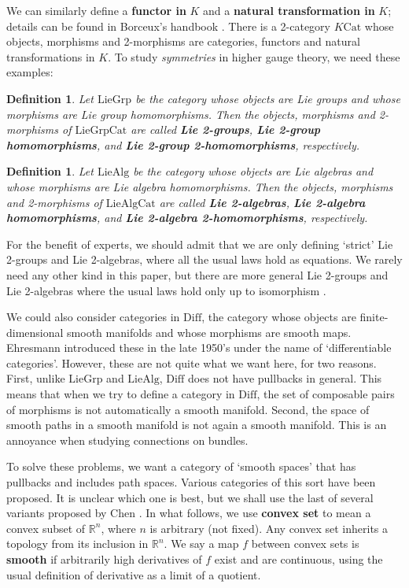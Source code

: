 \documentclass{article}
\newcommand{\R}{{\mathbb R}}
\newcommand{\Cat}{\mathrm{Cat}}
\newcommand{\Grp}{\mathrm{Grp}}
\newcommand{\Lie}{\mathrm{Lie}}
\newcommand{\Alg}{\mathrm{Alg}}
\newcommand{\Diff}{\mathrm{Diff}}
\newtheorem{definition}[theorem]{Definition}
\newcommand{\et}{\hspace{-0.08in}{\bf .}\hspace{0.1in}}
\begin{document}
We can similarly define a {\bf functor in} $K$ and a {\bf natural
transformation in} $K$; details can be found in Borceux's handbook
\cite{Borceux}.  There is a 2-category $K\Cat$ whose objects,
morphisms and 2-morphisms are categories, functors and natural
transformations in $K$.  To study \emph{symmetries} in higher
gauge theory, we need these examples:

\begin{definition} \et
\label{Lie 2-group}
Let $\Lie\Grp$ be the category whose objects are Lie groups and whose 
morphisms are Lie group homomorphisms.   Then the objects, morphisms
and 2-morphisms of $\Lie\Grp\Cat$ are called {\bf Lie 2-groups}, 
{\bf Lie 2-group homomorphisms}, and {\bf Lie 2-group 
2-homomorphisms}, respectively.
\end{definition}

\begin{definition} \et
\label{Lie 2-algebra}
Let $\Lie\Alg$ be the category whose objects are Lie algebras and whose 
morphisms are Lie algebra homomorphisms.   Then the objects, morphisms
and 2-morphisms of $\Lie\Alg\Cat$ are called {\bf Lie 2-algebras}, 
{\bf Lie 2-algebra homomorphisms}, and {\bf Lie 2-algebra 
2-homomorphisms}, respectively.
\end{definition}

\noindent
For the benefit of experts, we should admit that we are only
defining `strict' Lie 2-groups and Lie 2-algebras, where all the usual
laws hold as equations.  We rarely need any other kind in this paper, 
but there are more general Lie 2-groups and Lie 2-algebras
where the usual laws hold only up to isomorphism 
\cite{BaezLauda:2003,BaezCrans:2003}.

We could also consider categories in $\Diff$, the category whose objects 
are finite-dimensional smooth manifolds and whose morphisms are smooth maps.  
Ehresmann \cite{Ehresmann:1959} introduced these in the late 1950's
under the name of `differentiable categories'.  However, these 
are not quite what we want here, for two reasons.  First, unlike $\Lie\Grp$ 
and $\Lie\Alg$, $\Diff$ does not have pullbacks in general.   This means
that when we try to define a category in $\Diff$, the set 
of composable pairs of morphisms is not automatically a smooth manifold.
Second, the space of smooth paths in a smooth manifold is not again a 
smooth manifold.  This is an annoyance when studying connections on
bundles.  

To solve these problems, we want a category of `smooth spaces' that has
pullbacks and includes path spaces.  Various categories of this sort 
have been proposed.  It is unclear which one is best, but we shall 
use the last of several variants proposed by Chen \cite{Chen:1977,Chen:1982}.  
In what follows, we use {\bf convex set} to mean a convex subset of 
$\R^n$, where $n$ is arbitrary (not fixed).  Any convex set inherits
a topology from its inclusion in $\R^n$.  We say a map $f$ 
between convex sets is {\bf smooth} if arbitrarily high derivatives 
of $f$ exist and are continuous, using the usual definition
of derivative as a limit of a quotient.   
\end{document}
